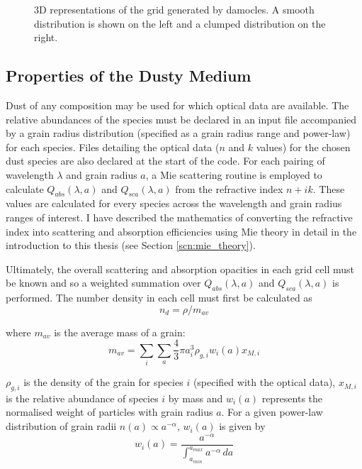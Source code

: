\begin{figure}
\begin{subfigure}{0.4\textwidth}
\end{subfigure}
\caption{3D representations of the grid generated by {\sc damocles}.  A smooth distribution is shown on the left and a clumped distribution on the right.}
\label{fig:grid}
\end{figure}


\subsection{Properties of the Dusty Medium}
\label{scn:grainsize}
Dust of any composition may be used for which optical data are available.  The relative abundances of the species must be declared in an input file accompanied by a grain radius distribution (specified as a grain radius range and power-law) for each species.  Files detailing the optical data ($n$ and $k$ values) for the chosen dust species are also declared at the start of the code.  For each pairing of wavelength $\lambda$ and grain radius $a$, a Mie scattering routine is employed to calculate $Q_{abs}(\lambda,a)$ and $Q_{sca}(\lambda,a)$ from the refractive index $n+ik$.  These values are calculated for every species across the wavelength and grain radius ranges of interest.  I have described the mathematics of converting the refractive index into scattering and absorption efficiencies using Mie theory in detail in the introduction to this thesis (see Section \ref{scn:mie_theory}).


Ultimately, the overall scattering and absorption opacities in each grid cell must be known and so a weighted summation over $Q_{abs}(\lambda,a)$ and $Q_{sca}(\lambda,a)$ is performed.  The number density in each cell must first be calculated as 
\begin{equation}
\label{eqn:density}
n_d = \rho/m_{av}
\end{equation}

\noindent where $m_{av}$ is the average mass of a grain: 
\begin{equation}
\label{eqn:Mav}
m_{av}=\sum_i \sum_a \frac{4}{3} \pi a_i^3 \rho_{g,i} w_i(a) x_{M,i}
\end{equation}

\noindent $\rho_{g,i}$ is the density of the grain for species $i$ (specified with the optical data), $x_{M,i}$ is the relative abundance of species $i$ by mass and $w_i(a)$ represents the normalised weight of particles with grain radius $a$.  For a given power-law distribution of grain radii $n(a) \propto a^{-\alpha}$,   $w_i(a)$ is given by
\begin{equation}
w_i(a)=\frac{a^{-\alpha}}{\int_{a_{min}}^{a_{max}} a^{-\alpha} \, da}
\end{equation}

